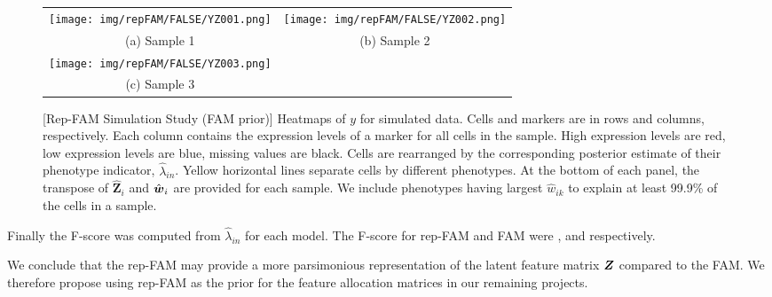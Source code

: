 \documentclass[12pt,]{article}
\def\lin{\lambda_{in}}
\def\Z{\bm{Z}}
\newcommand{\bZ}{\mbox{\boldmath $Z$}}
\newcommand{\bw}{\mbox{\boldmath $w$}}
\begin{document}
\begin{figure}[H]
  \begin{center}
  \begin{tabular}{cc}
  \texttt{[image: img/repFAM/FALSE/YZ001.png]}&
  \texttt{[image: img/repFAM/FALSE/YZ002.png]}\\
  {\small (a) Sample 1} & {\small(b) Sample 2} \\
  \texttt{[image: img/repFAM/FALSE/YZ003.png]}&\\
  {\small (c) Sample 3} & \\
  \end{tabular}
  \end{center}
  \vspace{-0.05in}
  \caption{\small[Rep-FAM Simulation Study (FAM prior)]  Heatmaps of $y$ for
    simulated data.  Cells and markers are in rows and columns, respectively.
    Each column contains the expression levels of a marker for all cells in the
    sample.  High expression levels are red, low expression levels are blue,
    missing values are black.  Cells are rearranged by the corresponding
    posterior estimate of their phenotype indicator, $\hat{\lambda}_{in}$.
    Yellow horizontal lines separate cells by different phenotypes.  At the
    bottom of each panel, the transpose of $\hat{\Z}_i$ and $\hat{\bw}_i$ are
    provided for each sample.  We include phenotypes having largest
    $\hat{w}_{ik}$ to explain at least 99.9\% of the cells in a sample.}
\label{fig:repFAM-FALSE-post-Z}
\end{figure}


Finally the F-score was computed from $\hat\lin$ for each model. 
The F-score for rep-FAM and FAM were ,
and  respectively. 

We conclude that the rep-FAM may provide a more parsimonious representation of
the latent feature matrix $\bZ$ compared to the FAM. We therefore propose
using rep-FAM as the prior for the feature allocation matrices in our 
remaining projects.
\end{document}
